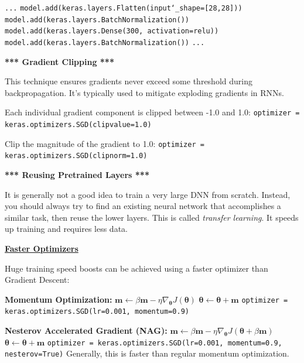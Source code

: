 \texttt{...}\newline
\texttt{model.add(keras.layers.Flatten(input\char`_shape=[28,28]))}\newline
\texttt{model.add(keras.layers.BatchNormalization())}\newline
\texttt{model.add(keras.layers.Dense(300, activation=\textquotesingle relu\textquotesingle))}\newline
\texttt{model.add(keras.layers.BatchNormalization())}\newline
\texttt{...}\newline

\textbf{*** Gradient Clipping ***}

This technique ensures gradients never exceed some threshold during backpropagation.\newline
It's typically used to mitigate exploding gradients in RNNs.

Each individual gradient component is clipped between -1.0 and 1.0:\newline
\texttt{optimizer = keras.optimizers.SGD(clipvalue=1.0)}

Clip the magnitude of the gradient to 1.0:\newline
\texttt{optimizer = keras.optimizers.SGD(clipnorm=1.0)}

\newpage

\textbf{*** Reusing Pretrained Layers ***}

It is generally not a good idea to train a very large DNN from scratch.
Instead, you should always try to find an existing neural network that accomplishes a similar task,
then reuse the lower layers. This is called \textit{transfer learning}.
It speeds up training and requires less data.\newline

\textbf{\underline{Faster Optimizers}}

Huge training speed boosts can be achieved using a faster optimizer than Gradient Descent:

\textbf{Momentum Optimization:}\newline
$\boldsymbol{m} \leftarrow \beta \boldsymbol{m} - \eta \nabla_{\boldsymbol{\theta}} J (\boldsymbol{\theta})$\newline
$\boldsymbol{\theta} \leftarrow \boldsymbol{\theta} + \boldsymbol{m}$\newline
\texttt{optimizer = keras.optimizers.SGD(lr=0.001, momentum=0.9)}\newline

\textbf{Nesterov Accelerated Gradient (NAG):}\newline
$\boldsymbol{m} \leftarrow \beta \boldsymbol{m} - \eta \nabla_{\boldsymbol{\theta}} J (\boldsymbol{\theta} + \beta \boldsymbol{m})$\newline
$\boldsymbol{\theta} \leftarrow \boldsymbol{\theta} + \boldsymbol{m}$\newline
\texttt{optimizer = keras.optimizers.SGD(lr=0.001, momentum=0.9, nesterov=True)}\newline
Generally, this is faster than regular momentum optimization.\newline


